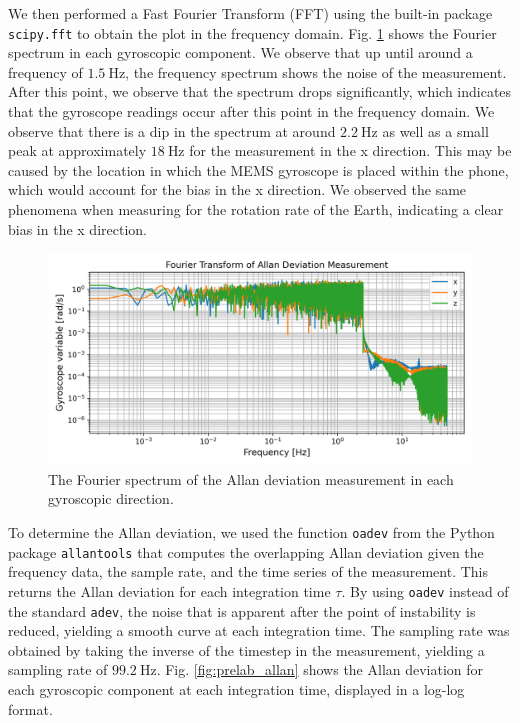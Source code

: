 \documentclass[a4paper]{report}
\numberwithin{equation}{section}
\begin{document}
We then performed a Fast Fourier Transform (FFT) using the built-in package \texttt{scipy.fft} to obtain the plot in the frequency
domain. Fig. \ref{fig:prelab_allan_fourier} shows the Fourier spectrum in each gyroscopic component. We observe that up until around
a frequency of $\SI[]{1.5}[]{\hertz}$, the frequency spectrum shows the noise of the measurement. After this point, we observe 
that the spectrum drops significantly, which indicates that the gyroscope readings occur after this point in the frequency domain. 
We observe that there is a dip in the spectrum at around $\SI{2.2}{\hertz}$ as well as a small peak at approximately 
$\SI{18}{\hertz}$ for the measurement in the x direction. This may be caused by the 
location in which the MEMS gyroscope is placed within the phone, which would account for the bias in the x direction. We observed the 
same phenomena when measuring for the rotation rate of the Earth, indicating a clear bias in the x direction. \par 

\begin{figure}[h!]
	\centering
	\includegraphics[width=0.75\columnwidth]{prelab_allan_fourier.png}

	\caption{The Fourier spectrum of the Allan deviation measurement in each gyroscopic direction.}
	\label{fig:prelab_allan_fourier}
\end{figure}

To determine the Allan deviation, we used the function \texttt{oadev} from the Python package \texttt{allantools} 
that computes the overlapping Allan deviation given the frequency data, the sample rate, and the time series of the measurement. This returns
the Allan deviation for each integration time $\tau$. By using \texttt{oadev} instead of the standard \texttt{adev}, the noise that is 
apparent after the point of instability is reduced, yielding a smooth curve at each integration time. The sampling rate was obtained by taking the inverse of the timestep in the 
measurement, yielding a sampling rate of $\SI[]{99.2}[]{\hertz}$. Fig. \ref{fig:prelab_allan} shows the Allan deviation for each gyroscopic component 
at each integration time, displayed in a log-log format. \par 
\end{document}
